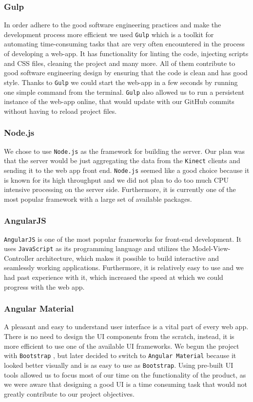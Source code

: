 \documentclass{article}
\begin{document}
\subsubsection{Gulp}
In order adhere to the good software engineering practices and make the development process more efficient we used \texttt{Gulp} \cite{gulp} which is a toolkit for automating time-consuming tasks that are very often encountered in the process of developing a web-app. It has functionality for linting the code, injecting scripts and CSS files, cleaning the project and many more. All of them contribute to good software engineering design by ensuring that the code is clean and has good style. Thanks to \texttt{Gulp} \cite{gulp} we could start the web-app in a few seconds by running one simple command from the terminal. \texttt{Gulp} \cite{gulp} also allowed us to run a persistent instance of the web-app online, that would update with our GitHub commits without having to reload project files.
\subsubsection{Node.js}
We chose to use \texttt{Node.js} \cite{node} as the framework for building the server. Our plan was that the server would be just aggregating the data from the \texttt{Kinect} clients and sending it to the web app front end. \texttt{Node.js} \cite{node} seemed like a good choice because it is known for its high throughput and we did not plan to do too much CPU intensive processing on the server side. Furthermore, it is currently one of the most popular framework with a large set of available packages.
\subsubsection{AngularJS}
\texttt{AngularJS} \cite{angular} is one of the most popular frameworks for front-end development. It uses \texttt{JavaScript} as its programming language and utilizes the Model-View-Controller architecture, which makes it possible to build interactive and seamlessly working applications. Furthermore, it is relatively easy to use and we had past experience with it, which increased the speed at which we could progress with the web app.
\subsubsection{Angular Material}
A pleasant and easy to understand user interface is a vital part of every web app. There is no need to design the UI components from the scratch, instead, it is more efficient to use one of the available UI frameworks. We begun the project with \texttt{Bootstrap} \cite{bootstrap}, but later decided to switch to \texttt{Angular Material} \cite{material} because it looked better visually and is as easy to use as \texttt{Bootstrap}. Using pre-built UI tools allowed us to focus most of our time on the functionality of the product, as we were aware that designing a good UI is a time consuming task that would not greatly contribute to our project objectives.
\end{document}
